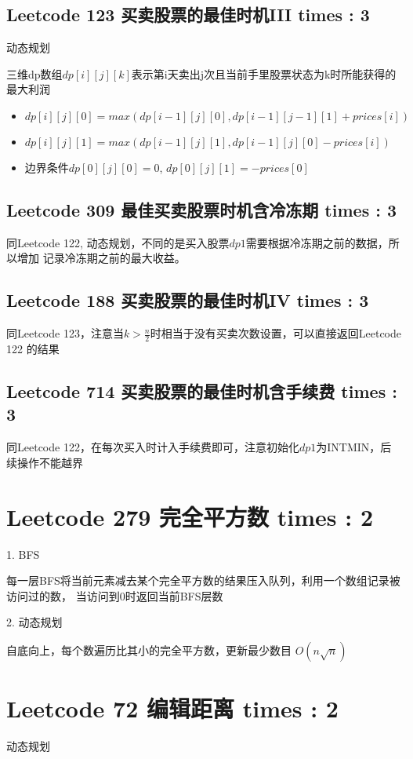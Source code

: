 \documentclass[UTF8]{ctexart}
\begin{document}
\subsection{Leetcode 123 买卖股票的最佳时机III times : 3}
动态规划

三维dp数组$dp[i][j][k]$表示第i天卖出j次且当前手里股票状态为k时所能获得的最大利润
\begin{itemize}
	\item $dp[i][j][0] = max(dp[i - 1][j][0], dp[i - 1][j - 1][1] + prices[i])$
	\item $dp[i][j][1] = max(dp[i - 1][j][1], dp[i - 1][j][0] - prices[i])$
	\item 边界条件$dp[0][j][0] = 0$, $dp[0][j][1] = -prices[0]$
\end{itemize}

\subsection{Leetcode 309 最佳买卖股票时机含冷冻期 times : 3}
同Leetcode 122, 动态规划，不同的是买入股票$dp1$需要根据冷冻期之前的数据，所以增加
记录冷冻期之前的最大收益。

\subsection{Leetcode 188 买卖股票的最佳时机IV times : 3}
同Leetcode 123，注意当$k > \frac{n}{2}$时相当于没有买卖次数设置，可以直接返回Leetcode 122
的结果

\subsection{Leetcode 714 买卖股票的最佳时机含手续费 times : 3}
同Leetcode 122，在每次买入时计入手续费即可，注意初始化$dp1$为INTMIN，后续操作不能越界

\section{Leetcode 279 完全平方数 times : 2}
1. BFS

每一层BFS将当前元素减去某个完全平方数的结果压入队列，利用一个数组记录被访问过的数，
当访问到0时返回当前BFS层数

2. 动态规划

自底向上，每个数遍历比其小的完全平方数，更新最少数目 $O(n\sqrt{n})$

\section{Leetcode 72 编辑距离 times : 2}
动态规划
\end{document}

